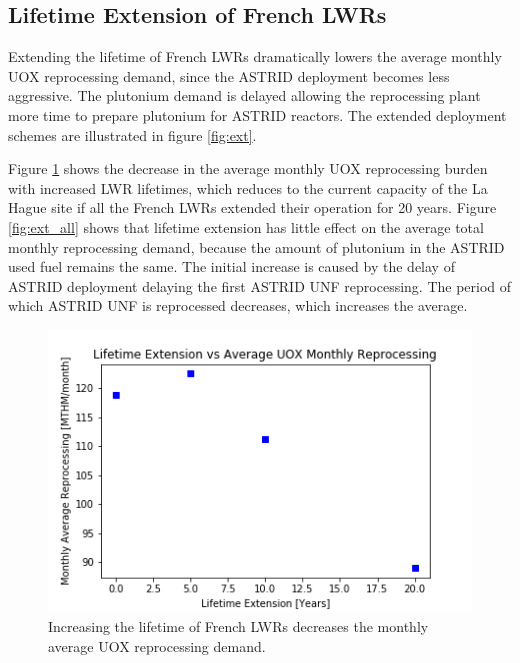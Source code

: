 \subsection{Lifetime Extension of French \glspl{LWR}}
Extending the lifetime of French \glspl{LWR} dramatically lowers the average
monthly \gls{UOX} reprocessing demand, since the \gls{ASTRID} deployment becomes less
aggressive. The plutonium demand is delayed allowing the reprocessing plant more
time to prepare plutonium for \gls{ASTRID} reactors. The
extended deployment schemes are illustrated in figure \ref{fig:ext}. 

Figure \ref{fig:ext_uox} shows the decrease in the average monthly
\gls{UOX} reprocessing burden with increased \gls{LWR} lifetimes,
which reduces to the current capacity of the La Hague site if all the
French \glspl{LWR} extended their operation for 20 years.
Figure \ref{fig:ext_all} shows that lifetime extension has little
effect on the average total monthly reprocessing demand, because
the amount of plutonium in the \gls{ASTRID} used fuel remains the same.
The initial increase is caused by the delay of \gls{ASTRID} deployment
delaying the first \gls{ASTRID} \gls{UNF} reprocessing. The period of which
\gls{ASTRID} \gls{UNF} is reprocessed decreases, which increases
the average.

\begin{figure}[htbp!]
    \begin{center}
        \includegraphics[scale=0.6]{./images/sensitivity/ext_uox.png}
    \end{center}
    \caption{Increasing the lifetime of French \glspl{LWR} decreases the monthly
             average \gls{UOX} reprocessing demand.}
    \label{fig:ext_uox}
\end{figure}


